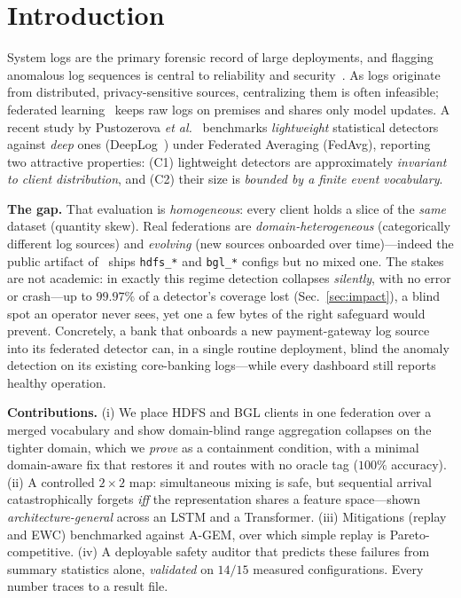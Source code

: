 \documentclass[conference]{IEEEtran}
\begin{document}
\section{Introduction}
System logs are the primary forensic record of large deployments, and flagging anomalous log
sequences is central to reliability and security~\cite{landauer2023survey}. As logs originate from
distributed, privacy-sensitive sources, centralizing them is often infeasible; federated
learning~\cite{mcmahan2017communication} keeps raw logs on premises and shares only model updates.
A recent study by Pustozerova \emph{et al.}~\cite{pustozerova2026lightweight} benchmarks
\emph{lightweight} statistical detectors against \emph{deep} ones (DeepLog~\cite{du2017deeplog})
under Federated Averaging (FedAvg), reporting two attractive properties: (C1) lightweight detectors
are approximately \emph{invariant to client distribution}, and (C2) their size is \emph{bounded by a
finite event vocabulary}.

\textbf{The gap.} That evaluation is \emph{homogeneous}: every client holds a slice of the
\emph{same} dataset (quantity skew). Real federations are \emph{domain-heterogeneous} (categorically
different log sources) and \emph{evolving} (new sources onboarded over time)---indeed the public
artifact of~\cite{pustozerova2026lightweight} ships \texttt{hdfs\_*} and \texttt{bgl\_*} configs but
no mixed one. The stakes are not academic: in exactly this regime detection collapses \emph{silently},
with no error or crash---up to $99.97\%$ of a detector's coverage lost (Sec.~\ref{sec:impact}), a
blind spot an operator never sees, yet one a few bytes of the right safeguard would prevent. Concretely,
a bank that onboards a new payment-gateway log source into its federated detector can, in a single
routine deployment, blind the anomaly detection on its existing core-banking logs---while every
dashboard still reports healthy operation.

\textbf{Contributions.} (i) We place HDFS and BGL clients in one federation over a merged vocabulary
and show domain-blind range aggregation collapses on the tighter domain, which we \emph{prove} as a
containment condition, with a minimal domain-aware fix that restores it and routes with no oracle tag
($100\%$ accuracy). (ii) A controlled $2\times2$ map: simultaneous mixing is safe, but sequential
arrival catastrophically forgets \emph{iff} the representation shares a feature space---shown
\emph{architecture-general} across an LSTM and a Transformer. (iii) Mitigations (replay and EWC)
benchmarked against A-GEM, over which simple replay is Pareto-competitive. (iv) A deployable safety
auditor that predicts these failures from summary statistics alone, \emph{validated} on $14/15$
measured configurations. Every number traces to a result file.
\end{document}
